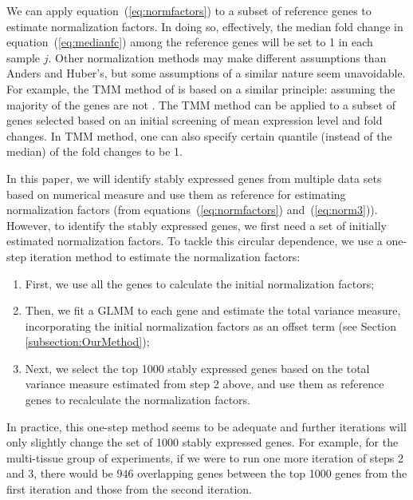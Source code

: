 We can apply equation~(\ref{eq:normfactors}) to a subset of reference genes to
estimate normalization factors.  In doing so,  effectively, the median fold
change in equation~(\ref{eq:medianfc}) among the reference genes will be set
to 1 in each sample $j$.
Other normalization methods may make different assumptions
than Anders and Huber's, but some assumptions of a similar nature seem
unavoidable.  For example, the TMM method of \citet{robinson2010scaling} is
based on a similar principle: assuming the majority of the genes are not \DED.
The TMM method can be applied to a subset of genes selected based on an
initial screening of mean expression level and fold changes. In TMM method,
one can also specify certain quantile (instead of the median) of the fold
changes to be 1.

In this paper, we will identify stably expressed genes from multiple data sets
based on numerical measure and use them as reference for estimating
normalization factors (from equations~(\ref{eq:normfactors}) and~(\ref{eq:norm3})). 
However, to identify the stably expressed genes, we first
need a set
of initially estimated normalization factors.  To tackle this circular
dependence, we use a one-step iteration method to estimate the normalization
factors: 
\begin{enumerate}
	\item
	First, we use all the genes to calculate the initial normalization factors; 
	\item
	Then, we fit a GLMM to each gene and estimate the total variance measure, incorporating the 
	initial normalization factors as
	an offset term (see Section \ref{subsection:OurMethod}); 
	\item
	Next, we select the top 1000 stably expressed genes based on the total
	variance measure estimated from step 2 above, and use them as
	reference genes to recalculate the normalization factors. 
\end{enumerate}
In practice, this one-step method seems to be adequate and further iterations
will only slightly change the set of 1000 stably expressed genes.  For
example, for the multi-tissue group of experiments, if we were to run one more
iteration of steps 2 and 3, there would be $946$ overlapping genes between
the top 1000 genes from the first iteration and those from the second
iteration.



